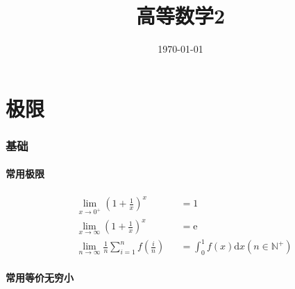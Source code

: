 \documentclass{article}
\title{高等数学2}
\author{}
\date{\today}
\begin{document}
\hypersetup{
    hidelinks,
    allcolors = black,
    breaklinks = true
}

\newtheorem{definition}{Definition}[subsection]
\newtheorem{theorem}{Theorem}[subsection]
\newtheorem{corollary}{Corollary}[theorem]
\renewcommand{\proofname}{\indent\bf Proof}
\renewcommand{\Re}{\operatorname{Re}}
\renewcommand{\Im}{\operatorname{Im}}

\def\e{\mathrm e}
\def\i{\mathrm i}
\def\d{\mathrm d}
\def\C{\mathrm C}
\def\vecv{\vec{\mathrm v}}
\def\sr{\mathbb R}
\def\sn{\mathbb N}
\def\snp{\mathbb N^+}
\def\sc{\mathbb C}
\def\sz{\mathbb Z}
\def\sech{\mathrm{sech}}
\def\csch{\mathrm{csch}}

\newcommand{\abs}[1]{\left|#1\right|}
\newcommand{\p}[1]{\left(#1\right)}
\newcommand{\jacobi}[2]{\frac{\partial\p{#1}}{\partial\p{#2}}}

\begin{titlepage}
    \maketitle
\end{titlepage}

\tableofcontents
\newpage

\part{极限}

\section{基础}

\subsection{常用极限}

\[\begin{aligned}
         & \lim_{x\to0^+}{\p{1+\frac1x}^x}                     &  & =1                              \\
         & \lim_{x\to\infty}{\p{1+\frac1x}^x}                  &  & =\e                             \\
         & \lim_{n\to\infty}{\frac1n\sum_{i=1}^nf\p{\frac in}} &  & =\int_0^1f\p{x}\d x\p{n\in\snp}
    \end{aligned}\]

\subsection{常用等价无穷小}
\end{document}

